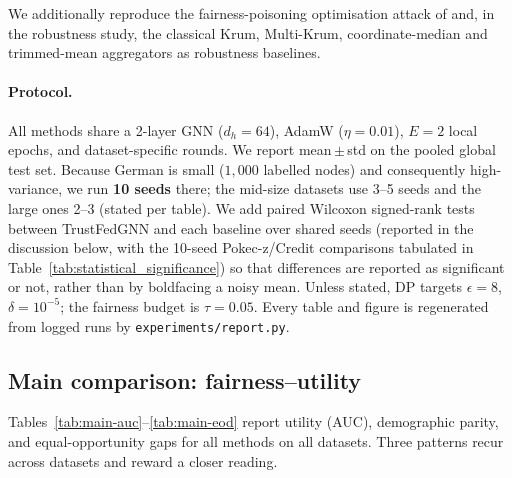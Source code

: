 \documentclass[pdflatex,sn-mathphys-num]{sn-jnl}
\theoremstyle{thmstyleone}%
\theoremstyle{thmstyletwo}%
\theoremstyle{thmstylethree}%
\begin{document}
We additionally reproduce the fairness-poisoning optimisation attack of
\cite{kasyap2025attack} and, in the robustness study, the classical Krum,
Multi-Krum, coordinate-median and trimmed-mean aggregators
\cite{blanchard2017krum,yin2018byzantine} as robustness baselines.

\paragraph{Protocol.}
All methods share a 2-layer GNN ($d_h{=}64$), AdamW ($\eta{=}0.01$), $E{=}2$
local epochs, and dataset-specific rounds. We report mean\,$\pm$\,std on the
pooled global test set. Because German is small ($1{,}000$ labelled nodes) and
consequently high-variance, we run \textbf{10 seeds} there; the mid-size
datasets use 3--5 seeds and the large ones 2--3 (stated per table). We add
paired Wilcoxon signed-rank tests between TrustFedGNN and each baseline over
shared seeds (reported in the discussion below, with the 10-seed Pokec-z/Credit
comparisons tabulated in Table~\ref{tab:statistical_significance}) so that
differences are reported as significant or not, rather than by boldfacing a
noisy mean. Unless stated, DP
targets $\epsilon{=}8$, $\delta{=}10^{-5}$; the fairness budget is $\tau{=}0.05$.
Every table and figure is regenerated from logged runs by
\texttt{experiments/report.py}.

\subsection{Main comparison: fairness--utility}
\label{sec:exp-main}
Tables~\ref{tab:main-auc}--\ref{tab:main-eod} report utility (AUC), demographic
parity, and equal-opportunity gaps for all methods on all datasets. Three
patterns recur across datasets and reward a closer reading.
\end{document}

